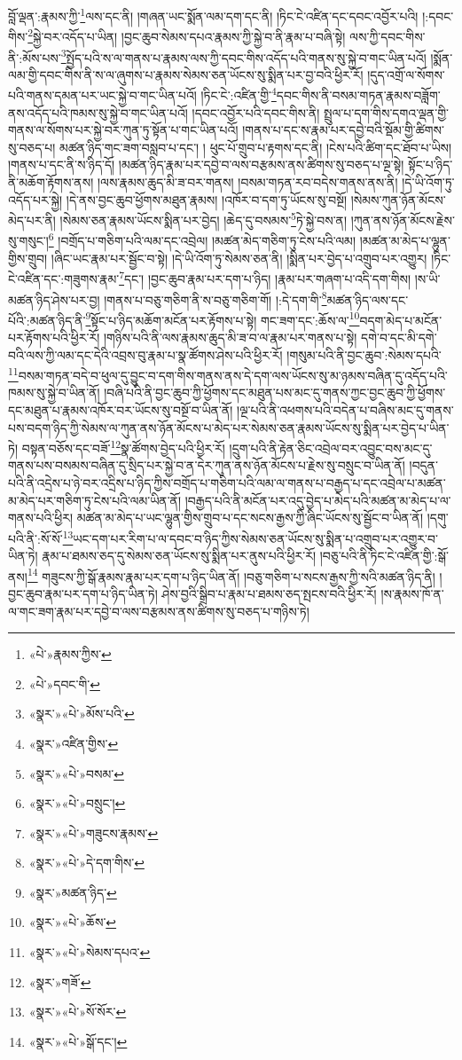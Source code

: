 བློ་ལྡན་:རྣམས་ཀྱི་\footnote{«པེ་»རྣམས་ཀྱིས་}ལས་དང་ནི། །གཞན་ཡང་སྨོན་ལམ་དག་དང་ནི། །ཏིང་ངེ་འཛིན་དང་དབང་འབྱོར་པའི། །:དབང་གིས་\footnote{«པེ་»དབང་གི་}སྐྱེ་བར་འདོད་པ་ཡིན། །བྱང་ཆུབ་སེམས་དཔའ་རྣམས་ཀྱི་སྐྱེ་བ་ནི་རྣམ་པ་བཞི་སྟེ། ལས་ཀྱི་དབང་གིས་ནི་:མོས་པས་\footnote{«སྣར་»«པེ་»མོས་པའི་}སྤྱོད་པའི་ས་ལ་གནས་པ་རྣམས་ལས་ཀྱི་དབང་གིས་འདོད་པའི་གནས་སུ་སྐྱེ་བ་གང་ཡིན་པའོ། །སྨོན་ལམ་གྱི་དབང་གིས་ནི་ས་ལ་ཞུགས་པ་རྣམས་སེམས་ཅན་ཡོངས་སུ་སྨིན་པར་བྱ་བའི་ཕྱིར་རོ། །དུད་འགྲོ་ལ་སོགས་པའི་གནས་དམན་པར་ཡང་སྐྱེ་བ་གང་ཡིན་པའོ། །ཏིང་ངེ་:འཛིན་གྱི་\footnote{«སྣར་»འཛིན་གྱིས་}དབང་གིས་ནི་བསམ་གཏན་རྣམས་བཟློག་ནས་འདོད་པའི་ཁམས་སུ་སྐྱེ་བ་གང་ཡིན་པའོ། །དབང་འབྱོར་པའི་དབང་གིས་ནི། སྤྲུལ་པ་དག་གིས་དགའ་ལྡན་གྱི་གནས་ལ་སོགས་པར་སྐྱེ་བར་ཀུན་ཏུ་སྟོན་པ་གང་ཡིན་པའོ། །གནས་པ་དང་ས་རྣམ་པར་དབྱེ་བའི་སྡོམ་གྱི་ཚིགས་སུ་བཅད་པ། མཚན་ཉིད་གང་ཟག་བསླབ་པ་དང་། །
ཕུང་པོ་གྲུབ་པ་རྟགས་དང་ནི། །ངེས་པའི་ཚིག་དང་ཐོབ་པ་ཡིས། །གནས་པ་དང་ནི་ས་ཉིད་དོ། །མཚན་ཉིད་རྣམ་པར་དབྱེ་བ་ལས་བརྩམས་ནས་ཚིགས་སུ་བཅད་པ་ལྔ་སྟེ། སྟོང་པ་ཉིད་ནི་མཆོག་རྟོགས་ནས། །ལས་རྣམས་ཆུད་མི་ཟ་བར་གནས། །བསམ་གཏན་རབ་བདེས་གནས་ནས་ནི། །དེ་ཡི་འོག་ཏུ་འདོད་པར་སྐྱེ། །དེ་ནས་བྱང་ཆུབ་ཕྱོགས་མཐུན་རྣམས། །འཁོར་བ་དག་ཏུ་ཡོངས་སུ་བསྔོ། །སེམས་ཀུན་ཉོན་མོངས་མེད་པར་ནི། །སེམས་ཅན་རྣམས་ཡོངས་སྨིན་པར་བྱེད། །ཆེད་དུ་བསམས་\footnote{«སྣར་»«པེ་»བསམ་}ཏེ་སྐྱེ་བས་ན། །ཀུན་ནས་ཉོན་མོངས་རྗེས་སུ་གསུང་།\footnote{«སྣར་»«པེ་»བསྲུང་།} །བགྲོད་པ་གཅིག་པའི་ལམ་དང་འབྲེལ། །མཚན་མེད་གཅིག་ཏུ་ངེས་པའི་ལམ། །མཚན་མ་མེད་པ་ལྷུན་གྱིས་གྲུབ། །ཞིང་ཡང་རྣམ་པར་སྦྱོང་བ་སྟེ། །དེ་ཡི་འོག་ཏུ་སེམས་ཅན་ནི། །སྨིན་པར་བྱེད་པ་འགྲུབ་པར་འགྱུར། །ཏིང་ངེ་འཛིན་དང་:གཟུགས་རྣམ་\footnote{«སྣར་»«པེ་»གཟུངས་རྣམས་}དང་། །བྱང་ཆུབ་རྣམ་པར་དག་པ་ཉིད། །རྣམ་པར་གཞག་པ་འདི་དག་གིས། །ས་ཡི་མཚན་ཉིད་ཤེས་པར་བྱ། །གནས་པ་བཅུ་གཅིག་ནི་ས་བཅུ་གཅིག་གོ། །:དེ་དག་གི་\footnote{«སྣར་»«པེ་»དེ་དག་གིས་}མཚན་ཉིད་ལས་དང་པོའི་:མཚན་ཉིད་ནི་\footnote{«སྣར་»མཚན་ཉིད་}སྟོང་པ་ཉིད་མཆོག་མངོན་པར་རྟོགས་པ་སྟེ། གང་ཟག་དང་:ཆོས་ལ་\footnote{«སྣར་»«པེ་»ཆོས་}བདག་མེད་པ་མངོན་པར་རྟོགས་པའི་ཕྱིར་རོ། །གཉིས་པའི་ནི་ལས་རྣམས་ཆུད་མི་ཟ་བ་ལ་རྣམ་པར་གནས་པ་སྟེ། དགེ་བ་དང་མི་དགེ་བའི་ལས་ཀྱི་ལམ་དང་དེའི་འབྲས་བུ་རྣམ་པ་སྣ་ཚོགས་ཤེས་པའི་ཕྱིར་རོ། །གསུམ་པའི་ནི་བྱང་ཆུབ་:སེམས་དཔའི་\footnote{«སྣར་»«པེ་»སེམས་དཔའ་}བསམ་གཏན་བདེ་བ་ཕུལ་དུ་བྱུང་བ་དག་གིས་གནས་ནས་དེ་དག་ལས་ཡོངས་སུ་མ་ཉམས་བཞིན་དུ་འདོད་པའི་ཁམས་སུ་སྐྱེ་བ་ཡིན་ནོ། །བཞི་པའི་ནི་བྱང་ཆུབ་ཀྱི་ཕྱོགས་དང་མཐུན་པས་མང་དུ་གནས་ཀྱང་བྱང་ཆུབ་ཀྱི་ཕྱོགས་དང་མཐུན་པ་རྣམས་འཁོར་བར་ཡོངས་སུ་བསྔོ་བ་ཡིན་ནོ། །ལྔ་པའི་ནི་འཕགས་པའི་བདེན་པ་བཞིས་མང་དུ་གནས་པས་བདག་ཉིད་ཀྱི་སེམས་ལ་ཀུན་ནས་ཉོན་མོངས་པ་མེད་པར་སེམས་ཅན་རྣམས་ཡོངས་སུ་སྨིན་པར་བྱེད་པ་ཡིན་ཏེ། བསྟན་བཅོས་དང་བཟོ་\footnote{«སྣར་»གཟོ་}སྣ་ཚོགས་བྱེད་པའི་ཕྱིར་རོ། །དྲུག་པའི་ནི་རྟེན་ཅིང་འབྲེལ་བར་འབྱུང་བས་མང་དུ་གནས་པས་བསམས་བཞིན་དུ་སྲིད་པར་སྐྱེ་བ་ན་དེར་ཀུན་ནས་ཉོན་མོངས་པ་རྗེས་སུ་བསྲུང་བ་ཡིན་ནོ། །བདུན་པའི་ནི་འདྲེས་པ་ཉེ་བར་འདྲིས་པ་ཉིད་ཀྱིས་བགྲོད་པ་གཅིག་པའི་ལམ་ལ་གནས་པ་བརྒྱད་པ་དང་འབྲེལ་པ་མཚན་མ་མེད་པར་གཅིག་ཏུ་ངེས་པའི་ལམ་ཡིན་ནོ། །བརྒྱད་པའི་ནི་མངོན་པར་འདུ་བྱེད་པ་མེད་པའི་མཚན་མ་མེད་པ་ལ་གནས་པའི་ཕྱིར། མཚན་མ་མེད་པ་ཡང་ལྷུན་གྱིས་གྲུབ་པ་དང་སངས་རྒྱས་ཀྱི་ཞིང་ཡོངས་སུ་སྦྱོང་བ་ཡིན་ནོ། །དགུ་པའི་ནི་:སོ་སོ་\footnote{«སྣར་»«པེ་»སོ་སོར་}ཡང་དག་པར་རིག་པ་ལ་དབང་བ་ཉིད་ཀྱིས་སེམས་ཅན་ཡོངས་སུ་སྨིན་པ་འགྲུབ་པར་འགྱུར་བ་ཡིན་ཏེ། རྣམ་པ་ཐམས་ཅད་དུ་སེམས་ཅན་ཡོངས་སུ་སྨིན་པར་ནུས་པའི་ཕྱིར་རོ། །བཅུ་པའི་ནི་ཏིང་ངེ་འཛིན་གྱི་:སྒོ་ནས།\footnote{«སྣར་»«པེ་»སྒོ་དང་།} གཟུངས་ཀྱི་སྒོ་རྣམས་རྣམ་པར་དག་པ་ཉིད་ཡིན་ནོ། །བཅུ་གཅིག་པ་སངས་རྒྱས་ཀྱི་སའི་མཚན་ཉིད་ནི། །བྱང་ཆུབ་རྣམ་པར་དག་པ་ཉིད་ཡིན་ཏེ། ཤེས་བྱའི་སྒྲིབ་པ་རྣམ་པ་ཐམས་ཅད་སྤངས་བའི་ཕྱིར་རོ། །ས་རྣམས་ཁོ་ན་ལ་གང་ཟག་རྣམ་པར་དབྱེ་བ་ལས་བརྩམས་ནས་ཚིགས་སུ་བཅད་པ་གཉིས་ཏེ། 
